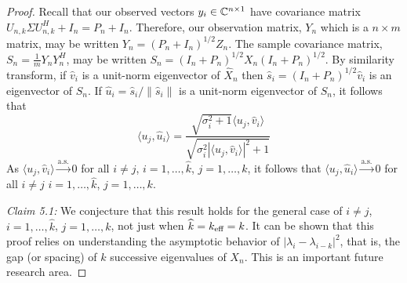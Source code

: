 \begin{proof}
Recall that our observed vectors $y_i\in\mathbb{C}^{n\times 1}$ have covariance matrix $U_{n,k}\Sigma U_{n,k}^H+I_n=P_n+I_n$. Therefore, our observation matrix, $Y_n$ which is a $n\times m$ matrix, may be written $Y_n=\left(P_n+I_n\right)^{1/2}Z_n$. The sample covariance matrix, $S_n=\frac{1}{m}Y_nY_n^H$, may be written $S_n=\left(I_n+P_n\right)^{1/2}X_n\left(I_n+P_n\right)^{1/2}$. By similarity transform, if $\widehat{v}_i$ is a unit-norm eigenvector of $\widehat{X}_n$ then $\widehat{s}_i=\left(I_n+P_n\right)^{1/2}\widehat{v}_i$ is an eigenvector of $S_n$. If $\widehat{u}_i=\widehat{s}_i/\|\widehat{s}_i\|$ is a unit-norm eigenvector of $S_n$, it follows that
\begin{equation*}
\langle u_j,\widehat{u}_i\rangle=\frac{\sqrt{\sigma_i^2+1}\langle u_j,\widehat{v}_i\rangle}{\sqrt{\sigma_i^2|\langle u_j,\widehat{v}_i\rangle|^2+1}}
\end{equation*}
As $\langle u_j,\widehat{v}_i\rangle\overset{\text{a.s.}}{\longrightarrow}0$ for all $i\neq j$, $i=1,\dots,\widehat{k}$, $j=1,\dots,k$, it follows that $\langle u_j,\widehat{u}_i\rangle\overset{\text{a.s.}}{\longrightarrow}0$ for all $i\neq j$ $i=1,\dots,\widehat{k}$, $j=1,\dots,k$.


\textit{Claim 5.1:}  We conjecture that this result holds for the general case of $i\neq j$, $i=1,\dots,\widehat{k}$, $j=1,\dots,k$, not just when $\widehat{k}=k_\text{eff}=k$. It can be shown that this proof relies on understanding the asymptotic behavior of $|\lambda_i-\lambda_{i-k}|^2$, that is, the gap (or spacing) of $k$ successive eigenvalues of $X_n$. This is an important future research area. 


%
\end{proof}










